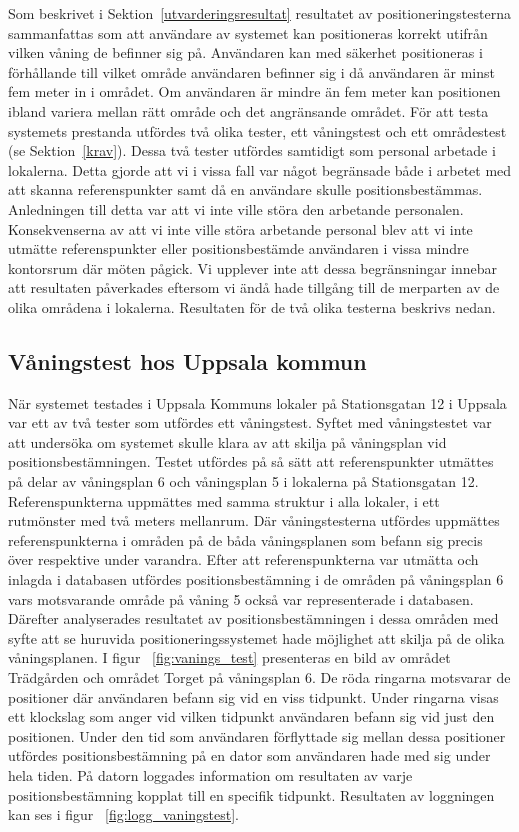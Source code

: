 \documentclass[a4paper,12pt]{article}
\begin{document}
 Som beskrivet i Sektion~\ref{utvarderingsresultat} resultatet av positioneringstesterna sammanfattas som att användare av systemet kan positioneras korrekt utifrån vilken våning de befinner sig på. Användaren kan med säkerhet positioneras i förhållande till vilket område användaren befinner sig i då användaren är minst fem meter in i området. Om användaren är mindre än fem meter kan positionen ibland variera mellan rätt område och det angränsande området.
 För att testa systemets prestanda utfördes två olika tester, ett våningstest och ett områdestest (se Sektion~\ref{krav}). Dessa två tester utfördes samtidigt som personal arbetade i lokalerna. Detta gjorde att vi i vissa fall var något begränsade både i arbetet med att skanna referenspunkter samt då en användare skulle positionsbestämmas. Anledningen till detta var att vi inte ville störa den arbetande personalen. Konsekvenserna av att vi inte ville störa arbetande personal blev att vi inte utmätte referenspunkter eller positionsbestämde användaren i vissa mindre kontorsrum där möten pågick. Vi upplever inte att dessa begränsningar innebar att resultaten påverkades eftersom vi ändå hade tillgång till de merparten av de olika områdena i lokalerna. Resultaten för de två olika testerna beskrivs nedan.


 \subsection{Våningstest hos Uppsala kommun}\label{vaningstest}
 När systemet testades i Uppsala Kommuns lokaler på Stationsgatan 12 i Uppsala var ett av två tester som utfördes ett våningstest. Syftet med våningstestet var att undersöka om systemet skulle klara av att skilja på våningsplan vid positionsbestämningen. Testet utfördes på så sätt att referenspunkter utmättes på delar av våningsplan 6 och våningsplan 5 i lokalerna på Stationsgatan 12. Referenspunkterna uppmättes med samma struktur i alla lokaler, i ett rutmönster med två meters mellanrum. Där våningstesterna utfördes uppmättes referenspunkterna i områden på de båda våningsplanen som befann sig precis över respektive under varandra. Efter att referenspunkterna var utmätta och inlagda i databasen utfördes positionsbestämning i de områden på våningsplan 6 vars motsvarande område på våning 5 också var representerade i databasen. Därefter analyserades resultatet av positionsbestämningen i dessa områden med syfte att se huruvida positioneringssystemet hade möjlighet att skilja på de olika våningsplanen. I figur ~\ref{fig:vanings_test} presenteras en bild av området Trädgården och området Torget på våningsplan 6. De röda ringarna motsvarar de positioner där användaren befann sig vid en viss tidpunkt. Under ringarna visas ett klockslag som anger vid vilken tidpunkt användaren befann sig vid just den positionen. Under den tid som användaren förflyttade sig mellan dessa positioner utfördes positionsbestämning på en dator som användaren hade med sig under hela tiden. På datorn loggades information om resultaten av varje positionsbestämning kopplat till en specifik tidpunkt. Resultaten av loggningen kan ses i figur ~\ref{fig:logg_vaningstest}.
\end{document}
